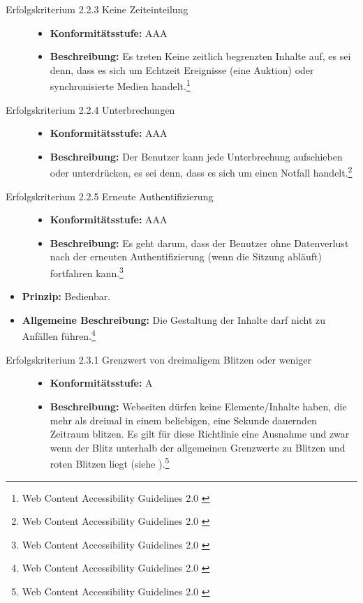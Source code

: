 \begin{description}
\begin{description}
		\item[Erfolgskriterium 2.2.3 Keine Zeiteinteilung]\hfill
		\begin{itemize}
			\item \textbf{Konformitätsstufe:} AAA
			\item \textbf{Beschreibung:} Es treten Keine zeitlich begrenzten Inhalte auf, es sei denn, dass es sich um Echtzeit Ereignisse (eine Auktion) oder  
			synchronisierte Medien handelt.\footnote{Web Content Accessibility Guidelines 2.0 \cite{WCAG2.0}}
		\end{itemize}
		
		\item[Erfolgskriterium 2.2.4 Unterbrechungen]\hfill
		\begin{itemize}
			\item \textbf{Konformitätsstufe:} AAA
			\item \textbf{Beschreibung:} Der Benutzer kann jede Unterbrechung aufschieben oder unterdrücken, es sei denn, dass es sich um einen Notfall 
			handelt.\footnote{Web Content Accessibility Guidelines 2.0 \cite{WCAG2.0}}
		\end{itemize}
		
		\item[Erfolgskriterium 2.2.5 Erneute Authentifizierung]\hfill
		\begin{itemize}
			\item \textbf{Konformitätsstufe:} AAA
			\item \textbf{Beschreibung:} Es geht darum, dass der Benutzer ohne Datenverlust nach der erneuten Authentifizierung (wenn die Sitzung abläuft) 
			fortfahren kann.\footnote{Web Content Accessibility Guidelines 2.0 \cite{WCAG2.0}}
		\end{itemize}
	\end{description}
	
	\item [Richtlinie 2.3 Anfälle]\hfill
	\begin{itemize}
		\item \textbf{Prinzip:} Bedienbar.
		\item \textbf{Allgemeine Beschreibung:} Die Gestaltung der Inhalte darf nicht zu Anfällen führen.\footnote{Web Content Accessibility Guidelines 2.0 \cite{WCAG2.0}}
	\end{itemize}
	
	\begin{description}
		\item[Erfolgskriterium 2.3.1 Grenzwert von dreimaligem Blitzen oder weniger]\hfill
		\begin{itemize}
			\item \textbf{Konformitätsstufe:} A
			\item \textbf{Beschreibung:} Webseiten dürfen keine Elemente/Inhalte haben, die mehr als dreimal in einem beliebigen, eine Sekunde dauernden Zeitraum 
			blitzen. Es gilt für diese Richtlinie eine Ausnahme und zwar wenn der Blitz unterhalb der allgemeinen Grenzwerte zu Blitzen und roten Blitzen liegt
			(siehe ).\footnote{Web Content Accessibility Guidelines 2.0 \cite{WCAG2.0}}
		\end{itemize}
		

\end{description}
\end{description}
